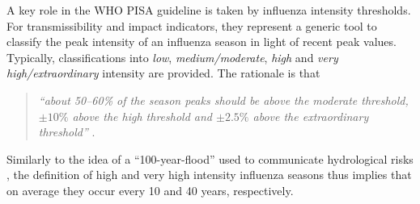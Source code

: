 \documentclass[12pt]{article}
\begin{document}
A key role in the WHO PISA guideline is taken by influenza intensity thresholds. For transmissibility and impact indicators, they represent a generic tool to classify the peak intensity of an influenza season in light of recent peak values. Typically, classifications into \textit{low}, \textit{medium/moderate}, \textit{high} and \textit{very high/extraordinary} intensity are provided. The rationale is that
\begin{quote}
\textit{``about 50--60\% of the season peaks should be above the moderate threshold, $\pm 10\%$ above the high threshold and $\pm 2.5\%$ above the extraordinary threshold''} \citep[p.10]{WHO2017}.
\end{quote}
Similarly to the idea of a ``100-year-flood'' used to communicate hydrological risks \citep{Holmes2010}, the definition of high and very high intensity influenza seasons thus implies that on average they occur every 10 and 40 years, respectively.
\end{document}
